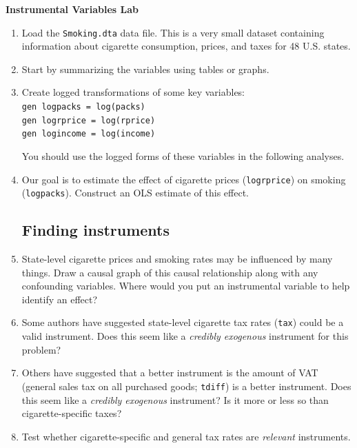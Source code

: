 \documentclass[a4paper,12pt]{article}
\begin{document}
\begin{center}
\Large\textbf{Instrumental Variables Lab}
\end{center}


\begin{enumerate}\itemsep0.5em

\subsection*{Getting started}

\item Load the \texttt{Smoking.dta} data file. This is a very small dataset containing information about cigarette consumption, prices, and taxes for 48 U.S. states.

\item Start by summarizing the variables using tables or graphs.
\item Create logged transformations of some key variables:\\
\texttt{gen logpacks = log(packs)\\
gen logrprice = log(rprice)\\
gen logincome = log(income)}

You should use the logged forms of these variables in the following analyses.

\item Our goal is to estimate the effect of cigarette prices (\texttt{logrprice}) on smoking (\texttt{logpacks}). Construct an OLS estimate of this effect.

\subsection*{Finding instruments}

\item State-level cigarette prices and smoking rates may be influenced by many things. Draw a causal graph of this causal relationship along with any confounding variables. Where would you put an instrumental variable to help identify an effect?
\item Some authors have suggested state-level cigarette tax rates (\texttt{tax}) could be a valid instrument. Does this seem like a {\em credibly exogenous} instrument for this problem?
\item Others have suggested that a better instrument is the amount of VAT (general sales tax on all purchased goods; \texttt{tdiff}) is a better instrument. Does this seem like a {\em credibly exogenous} instrument? Is it more or less so than cigarette-specific taxes?
\item Test whether cigarette-specific and general tax rates are {\em relevant} instruments.


\end{enumerate}
\end{document}
